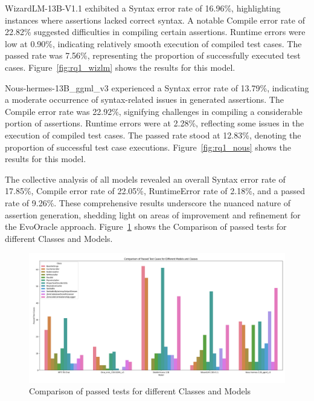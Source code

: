 WizardLM-13B-V1.1 exhibited a Syntax error rate of 16.96\%, highlighting instances where assertions lacked correct syntax. A notable Compile error rate of 22.82\% suggested difficulties in compiling certain assertions. Runtime errors were low at 0.90\%, indicating relatively smooth execution of compiled test cases. The passed rate was 7.56\%, representing the proportion of successfully executed test cases. Figure~\ref{fig:rq1_wizlm} shows the results for this model.

Nous-hermes-13B\_ggml\_v3 experienced a Syntax error rate of 13.79\%, indicating a moderate occurrence of syntax-related issues in generated assertions. The Compile error rate was 22.92\%, signifying challenges in compiling a considerable portion of assertions. Runtime errors were at 2.28\%, reflecting some issues in the execution of compiled test cases. The passed rate stood at 12.83\%, denoting the proportion of successful test case executions. Figure~\ref{fig:rq1_nous} shows the results for this model.

The collective analysis of all models revealed an overall Syntax error rate of 17.85\%, Compile error rate of 22.05\%, RuntimeError rate of 2.18\%, and a passed rate of 9.26\%. These comprehensive results underscore the nuanced nature of assertion generation, shedding light on areas of improvement and refinement for the EvoOracle approach. Figure~\ref{fig:rq1_pass_all} shows the Comparison of passed tests for different Classes and Models.

\begin{figure}[H]
\centering
\includegraphics[width=1\textwidth]{images/RQ1_pass_all.png}
\caption{Comparison of passed tests for different Classes and Models}
\label{fig:rq1_pass_all}
\end{figure}

